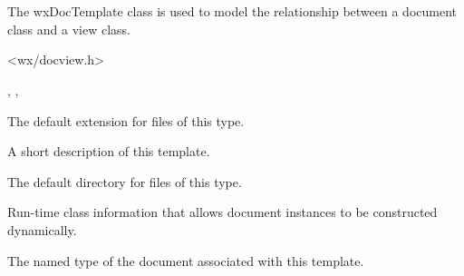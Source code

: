 \section{}\label{wxdoctemplate}

The wxDocTemplate class is used to model the relationship between a
document class and a view class.




<wx/docview.h>


, , 


\label{wxdoctemplatemdefaultext}


The default extension for files of this type.

\label{wxdoctemplatemdescription}


A short description of this template.

\label{wxdoctemplatemdirectory}


The default directory for files of this type.

\label{wxdoctemplatemdocclassinfo}


Run-time class information that allows document instances to be constructed dynamically.

\label{wxdoctemplatemdoctypename}


The named type of the document associated with this template.

\label{wxdoctemplatedocumentmanager}


